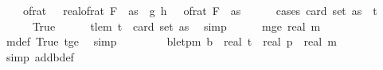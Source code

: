 \begin{isabellebody}
\ \ \ \ of{\isacharunderscore}{\kern0pt}rat\ {\isasymdelta}\ {\isacharasterisk}{\kern0pt}\ real{\isacharunderscore}{\kern0pt}of{\isacharunderscore}{\kern0pt}rat\ {\isacharparenleft}{\kern0pt}F\ {}\ as{\isacharparenright}{\kern0pt}\ {\isacharless}{\kern0pt}\ {\isasymbar}g{\isacharprime}{\kern0pt}\ {\isacharparenleft}{\kern0pt}h\ {\isasymomega}{\isacharparenright}{\kern0pt}\ {\isacharminus}{\kern0pt}\ of{\isacharunderscore}{\kern0pt}rat\ {\isacharparenleft}{\kern0pt}F\ {}\ as{\isacharparenright}{\kern0pt}{\isasymbar}{\isacharparenright}{\kern0pt}\ {\isasymle}\ {}{\isacharslash}{\kern0pt}{}{\isachardoublequoteclose}\isanewline
\ \ \isamarkupfalse%
\ {\isacharparenleft}{\kern0pt}cases\ {\isachardoublequoteopen}card\ {\isacharparenleft}{\kern0pt}set\ as{\isacharparenright}{\kern0pt}\ {\isasymge}\ t{\isachardoublequoteclose}{\isacharparenright}{\kern0pt}\isanewline
\ \ \ \ \isamarkupfalse%
\ True\isanewline
\ \ \ \ \isamarkupfalse%
\ t{\isacharunderscore}{\kern0pt}le{\isacharunderscore}{\kern0pt}m{\isacharcolon}{\kern0pt}\ {\isachardoublequoteopen}t\ {\isasymle}\ card\ {\isacharparenleft}{\kern0pt}set\ as{\isacharparenright}{\kern0pt}{\isachardoublequoteclose}\ \isamarkupfalse%
\ simp\isanewline
\ \ \ \ \isamarkupfalse%
\ m{\isacharunderscore}{\kern0pt}ge{\isacharunderscore}{\kern0pt}{}{\isacharcolon}{\kern0pt}\ {\isachardoublequoteopen}real\ m\ {\isachargreater}{\kern0pt}\ {}{\isachardoublequoteclose}\isanewline
\ \ \ \ \ \ \isamarkupfalse%
\ m{\isacharunderscore}{\kern0pt}def\ True\ t{\isacharunderscore}{\kern0pt}ge{\isacharunderscore}{\kern0pt}{}\ \isamarkupfalse%
\ simp\isanewline
\ \ \isanewline
\ \ \ \ \isamarkupfalse%
\ b{\isacharunderscore}{\kern0pt}le{\isacharunderscore}{\kern0pt}tpm\ {\isacharcolon}{\kern0pt}{\isachardoublequoteopen}b\ {\isasymle}\ real\ t\ {\isacharasterisk}{\kern0pt}\ real\ p\ {\isacharslash}{\kern0pt}\ {\isacharparenleft}{\kern0pt}real\ m\ {\isacharasterisk}{\kern0pt}\ {\isacharparenleft}{\kern0pt}{}\ {\isacharminus}{\kern0pt}\ {\isasymdelta}{\isacharprime}{\kern0pt}{\isacharparenright}{\kern0pt}{\isacharparenright}{\kern0pt}{\isachardoublequoteclose}\isanewline
\ \ \ \ \ \ \isamarkupfalse%
\ {\isacharparenleft}{\kern0pt}simp\ add{\isacharcolon}{\kern0pt}b{\isacharunderscore}{\kern0pt}def{\isacharparenright}{\kern0pt}\isanewline
\ \ \ \ \isamarkupfalse%
\ \isamarkupfalse%

\end{isabellebody}
